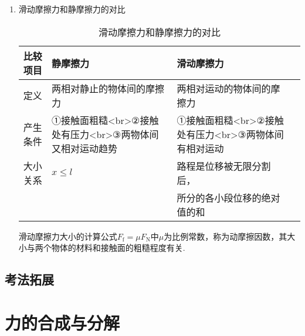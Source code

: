 \documentclass[cn,11pt]{elegantbook}
\begin{document}
\begin{enumerate}
\begin{enumerate}
         \end{enumerate}
         \item 滑动摩擦力和静摩擦力的对比
         \begin{table}[htbp]
            \centering
            \caption{滑动摩擦力和静摩擦力的对比}
              \begin{tabular}{llll}
              \toprule
              比较项目 & 静摩擦力 & 滑动摩擦力  \\
              \midrule
              定义 & 两相对静止的物体间的摩擦力 & 两相对运动的物体间的摩擦力\\
              产生条件 & ①接触面粗糙<br>②接触处有压力<br>③两物体间又相对运动趋势 & ①接触面粗糙<br>②接触处有压力<br>③两物体间有相对运动   \\
              大小关系 & $x \leqslant l$ & 路程是位移被无限分割后，\\
              &&所分的各小段位移的绝对值的和  \\
              \bottomrule
              \end{tabular}%
            \label{tab:theorem-class}%
          \end{table}%
          滑动摩擦力大小的计算公式$F_{\mathrm{f}}=\mu F_{\mathrm{N}}$中$μ$为比例常数，称为动摩擦因数，其大小与两个物体的材料和接触面的粗糙程度有关.
      \end{enumerate}
      \subsection{考法拓展}

   \section{力的合成与分解}
\end{document}
